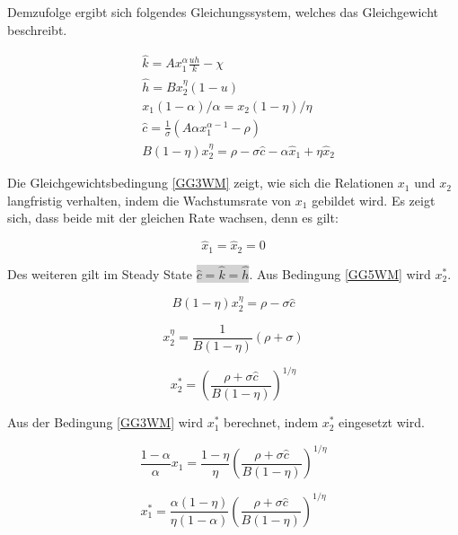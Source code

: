 Demzufolge ergibt sich folgendes Gleichungssystem, welches das Gleichgewicht beschreibt. 


	\begin{align}
		&\hat{k}=Ax_1^\alpha \frac{uh}{k}-\chi\label{GG1WM}\\
		&\hat{h}=Bx_2^\eta(1-u)\label{GG2WM}\\
		& x_1(1-\alpha)/\alpha =x_2(1-\eta)/\eta\label{GG3WM}\\
		&\hat{c}=\frac{1}{\sigma}\left(A\alpha x_1^{\alpha -1}-\rho\right)\label{GG4WM}\\
		&B(1-\eta)x_2^\eta=\rho-\sigma\hat{c}-\alpha\hat{x}_1+\eta\hat{x}_2\label{GG5WM}
	\end{align}

Die Gleichgewichtsbedingung \eqref{GG3WM} zeigt, wie sich die Relationen $x_1$ und $x_2$ langfristig verhalten, indem die Wachstumsrate von $x_1$ gebildet wird. Es zeigt sich, dass beide mit der gleichen Rate wachsen, denn es gilt:

	\begin{equation}
		\hat{x}_1=\hat{x}_2=0
	\end{equation}


Des weiteren gilt im Steady State \colorbox{lightgray}{$\hat{c}=\hat{k}=\hat{h}$}.
Aus Bedingung \eqref{GG5WM} wird $x_2^*$.


	\begin{equation}
		B(1-\eta)x_2^\eta=\rho-\sigma\hat{c}
	\end{equation}


	\begin{equation*}
		x_2^\eta=\frac{1}{B(1-\eta)}(\rho+\sigma)
	\end{equation*}


	\begin{equation}
		x_2^*=\left(\frac{\rho+\sigma\hat{c}}{B(1-\eta)}\right)^{1/\eta}
	\end{equation}

Aus der Bedingung \eqref{GG3WM} wird $x_1^*$ berechnet, indem $x_2^*$ eingesetzt wird.


	\begin{equation}
		\frac{1-\alpha}{\alpha}x_1 =\frac{1-\eta}{\eta}\left(\frac{\rho+\sigma\hat{c}}{B(1-\eta)}\right)^{1/\eta}
	\end{equation}


	\begin{equation}
		x_1^* =\frac{\alpha(1-\eta)}{\eta(1-\alpha)}\left(\frac{\rho+\sigma\hat{c}}{B(1-\eta)}\right)^{1/\eta}
	\end{equation}


